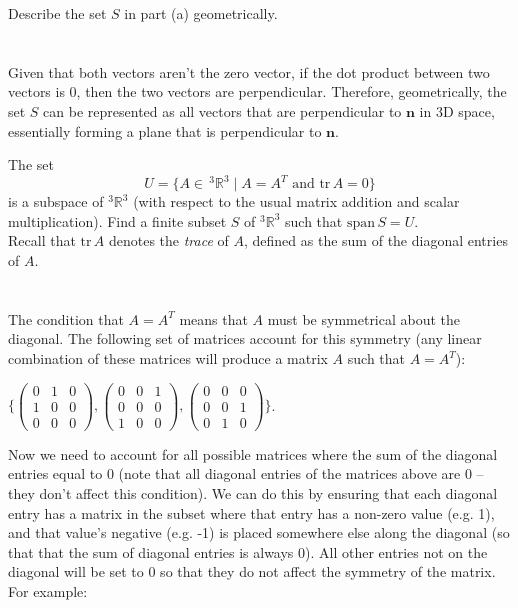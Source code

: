\documentclass[10pt]{exam}
\newcommand{\noin}{\noindent}
\begin{document}
\vspace{100pt}		%




\noin {\bf 1(b)} Describe the set $S$ in part (a) geometrically.
\\
\\
\\
Given that both vectors aren't the zero vector, if the dot product between 
two vectors is 0, then the two vectors are perpendicular. Therefore, 
geometrically, the set $S$ can be represented as all vectors that are perpendicular 
to $\textbf{n}$ in 3D space, essentially forming a plane that is perpendicular to 
$\textbf{n}$.		%


\pagebreak 


\noin {\bf 2.}   The set
$$U=\{ A \in \,^3\mathbb R^3 \mid A=A^T \mbox { and } \mathrm{tr}\, A = 0 \}$$
is a subspace of $^3\mathbb R^3$ (with respect to the usual matrix addition and scalar multiplication).  Find a finite subset $S$ of $^3\mathbb R^3$ such that $\mathrm{span}\, S =U$.\\

\noin Recall that $\mathrm{tr}\, A$ denotes the {\it trace} of $A$, defined as the sum of the diagonal entries of $A$.
\\
\\
\\
The condition that $A = A^T$ means that $A$ must be symmetrical about the 
diagonal. The following set of matrices account for this symmetry (any linear 
combination of these matrices will produce a matrix $A$ such that $A = A^T$):

\begin{center}
$\bigg\{ \begin{pmatrix}
	0 & 1 & 0 \\
	1 & 0 & 0 \\
	0 & 0 & 0 
\end{pmatrix},
\begin{pmatrix}
	0 & 0 & 1 \\
	0 & 0 & 0 \\
	1 & 0 & 0 
\end{pmatrix},
\begin{pmatrix}
	0 & 0 & 0 \\
	0 & 0 & 1 \\
	0 & 1 & 0 
\end{pmatrix}\bigg\}$.
\end{center}
Now we need to account for all possible matrices where the sum of the diagonal entries equal 
to 0 (note that all diagonal entries of the matrices above are 0 -- they don't affect this condition). 
We can do this by ensuring that each diagonal entry has a matrix in the 
subset where that entry has a non-zero value (e.g. 1), and that value's negative (e.g. -1)
is placed somewhere else along the diagonal (so that that the sum of diagonal 
entries is always 0). All other entries not on the diagonal will be set to 0 
so that they do not affect the symmetry of the matrix. For example:
\end{document}
